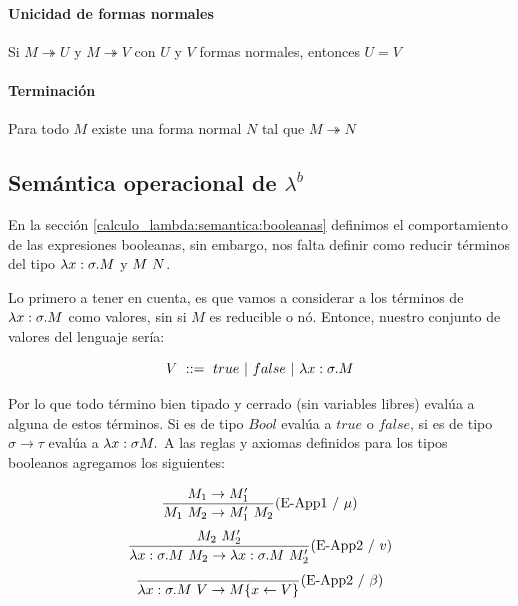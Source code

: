 \paragraph{Unicidad de formas normales} Si $M\twoheadrightarrow U$ y $M\twoheadrightarrow V$ con $U$ y $V$ formas normales, entonces $U = V$

\paragraph{Terminación}
Para todo $M$ existe una forma normal $N$ tal que $M\twoheadrightarrow N$


\subsection{Semántica operacional de \texorpdfstring{$\lambda^b$}{lambda b}}
En la sección \ref{calculo_lambda:semantica:booleanas} definimos el comportamiento de las expresiones booleanas, sin embargo, nos falta definir como reducir términos del tipo $\lambda x: \sigma . M$ y $M~N$.

Lo primero a tener en cuenta, es que vamos a considerar a los términos de $\lambda x: \sigma . M$ como valores, sin si $M$ es reducible o nó. Entonce, nuestro conjunto de valores del lenguaje sería:

$$ V  ~::=~ true~|~false~|~\lambda x: \sigma . M$$

Por lo que todo término bien tipado y cerrado (sin variables libres) evalúa a alguna de estos términos. Si es de tipo $Bool$ evalúa a $true$ o $false$, si es de tipo $\sigma\to\tau$ evalúa a $\lambdaAbs{x}{\sigma{M}}$
A las reglas y axiomas definidos para los tipos booleanos agregamos los siguientes:

\begin{equation*}
\frac{M_1\to M'_1}{M_1~M_2 \to 
M'_1~M_2}(\text{E-App1}~ /~ \mu)
\end{equation*}
\vspace*{5mm}
\begin{equation*}
\frac{M_2~M'_2}{\lambda x: \sigma . M~M_2 \to 
	\lambda x: \sigma . M~M'_2}(\text{E-App2}~/~v)
\end{equation*}	
\vspace*{5mm}
\begin{equation*}
\frac{}{\lambda x: \sigma . M~V \to 
	M\{x\leftarrow V\}}(\text{E-App2}~/~\beta)
\end{equation*}

